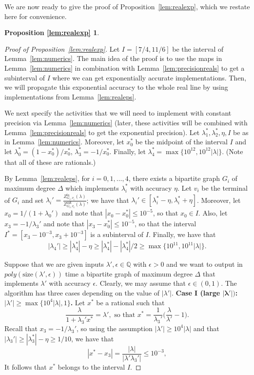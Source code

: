 \documentclass[11pt]{article}
\newtheorem*{lemrealexp}{Proposition \ref{lem:realexp}}
\def\Zin{Z^{\mathsf{in}}}
\def\Zout{Z^{\mathsf{out}}}
\def\QQ{\mathbb{Q}}
\newcommand{\size}[1]{\mathrm{size}(#1)}
\newcommand{\eps}{\epsilon}
\begin{document}
We are now ready to give the proof of Proposition~\ref{lem:realexp}, which we restate here for convenience.
\begin{lemrealexp}
\statelemrealexp
\end{lemrealexp}
\begin{proof}[Proof of Proposition~\ref{lem:realexp}]
Let $I=[7/4,11/6]$ be the interval of Lemma~\ref{lem:numerics}. The main idea of the proof is to use the maps in Lemma~\ref{lem:numerics} in combination with Lemma~\ref{lem:precisionreals} to get a subinterval of $I$ where we can get exponentially accurate implementations. Then, we will propagate this exponential accuracy to the whole real line by using implementations from Lemma~\ref{lem:realeps}. 


We next specify the activities that we will need to implement with constant precision via Lemma~\ref{lem:numerics} (later, these activities will be combined with Lemma~\ref{lem:precisionreals} to get the exponential precision). Let $\lambda_1^*,\lambda_2^*,\eta, I$ be as in Lemma~\ref{lem:numerics}. Moreover, let $x_0^*$ be the midpoint of the interval $I$ and let $\lambda_0^*=(1-x_0^*)/x_0^*$, $\lambda_3^*=-1/x_0^*$. Finally, let $\lambda_4^*=\max\{10^{12},10^{12}|\lambda|\}$. (Note that all of these are rationals.)

By Lemma~\ref{lem:realeps}, for $i=0,1,\hdots,4$, there exists a bipartite graph $G_i$ of maximum degree $\Delta$ which implements $\lambda_i^*$ with accuracy $\eta$. Let $v_i$ be the terminal of $G_i$ and set $\lambda_i'=\frac{\Zin_{G_i,v_i}(\lambda)}{\Zout_{G_i,v_i}(\lambda)}$; we have that $\lambda_i'\in [\lambda_i^*-\eta,\lambda_i^*+\eta]$.  Moreover, let $x_0=1/(1+\lambda_0')$ and note that $|x_0-x_0^*|\leq 10^{-5}$, so that $x_0\in I$. Also, let $x_3=-1/\lambda_3'$ and note that $|x_3-x_0^*|\leq 10^{-5}$, so that the interval $I^*=[x_3-10^{-3},x_3+10^{-3}]$ is a subinterval of  $I$.  Finally, we have that 
\begin{equation}\label{eq:y0choice0}
|\lambda_4'|\geq |\lambda_4^*|-\eta\geq |\lambda_4^*|-|\lambda_4^*|/2\geq \max\{10^{11},10^{11}|\lambda|\}.
\end{equation}


\vskip 0.2cm

Suppose that we are given inputs $\lambda',\eps\in \QQ$ with $\eps>0$  and we want to output in $poly(\size{\lambda',\eps})$ time a bipartite graph of maximum degree $\Delta$ that implements $\lambda'$ with accuracy $\epsilon$. Clearly, we may assume that $\eps\in (0,1)$. The algorithm has three cases depending on the value of $|\lambda'|$.
\vskip 0.2cm
\noindent \textbf{Case I (large $\mathbf{|\lambda'|})$: $|\lambda'|\geq \max\{10^4|\lambda|,1\}$.}  Let $x^*$ be a rational such that
\begin{equation}\label{eq:3fgg56yy35tg}
\frac{\lambda}{1+\lambda_3' x^*}=\lambda', \mbox{ so that } x^*=\frac{1}{\lambda_3'}\Big(\frac{\lambda}{\lambda'}-1\Big).
\end{equation}
Recall that $x_3=-1/\lambda_3'$, so using the assumption $|\lambda'|\geq 10^4|\lambda|$ and that $|\lambda_3'|\geq |\lambda_3^*|-\eta\geq 1/10$, we have that
\[|x^*-x_3|=\frac{|\lambda|}{|\lambda'\lambda_3'|}\leq 10^{-3},\]
It follows that $x^*$ belongs to the interval  $I$.



\end{proof}
\end{document}
